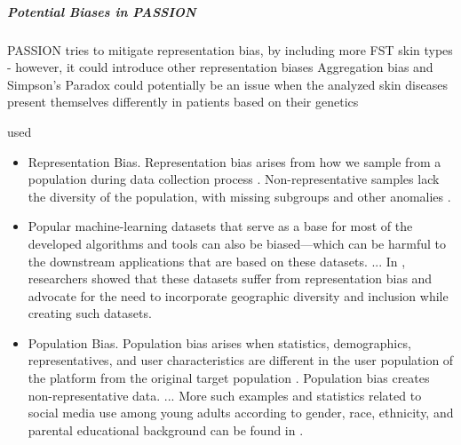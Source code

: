 \begin{refsection}
		
		\subparagraph{Potential Biases in PASSION}
		PASSION tries to mitigate representation bias, by including more FST skin types - however, it could introduce other representation biases
		Aggregation bias and Simpson's Paradox could potentially be an issue when the analyzed skin diseases present themselves differently in patients based on their genetics
		
		
		\rawcitationstart
		used
		\begin{itemize}		
			\rawcitationusedstart
			\item Representation Bias. Representation bias arises from how we sample from a population during data collection process \autocite{M144_Suresh_2021}. Non-representative samples lack the diversity of the population, with missing subgroups and other anomalies \autocite{Mehrabi_2021}.
			\item Popular machine-learning datasets that serve as a base for most of the developed algorithms and tools can also be biased—which can be harmful to the downstream applications that are based on these datasets. ... In \autocite{M142_Shankar_2017}, researchers showed that these datasets suffer from representation bias and advocate for the need to incorporate geographic diversity and inclusion while creating such datasets. \autocite{Mehrabi_2021}
			
			\item Population Bias. Population bias arises when statistics, demographics, representatives, and user characteristics are different in the user population of the platform from the original target population \autocite{M120_Olteanu_2019}. Population bias creates non-representative data. ... More such examples and statistics related to social media use among young adults according to gender, race, ethnicity, and parental educational background can be found in \autocite{M64_Hargittai_2007}. \autocite{Mehrabi_2021}
			

\end{itemize}
\end{refsection}
